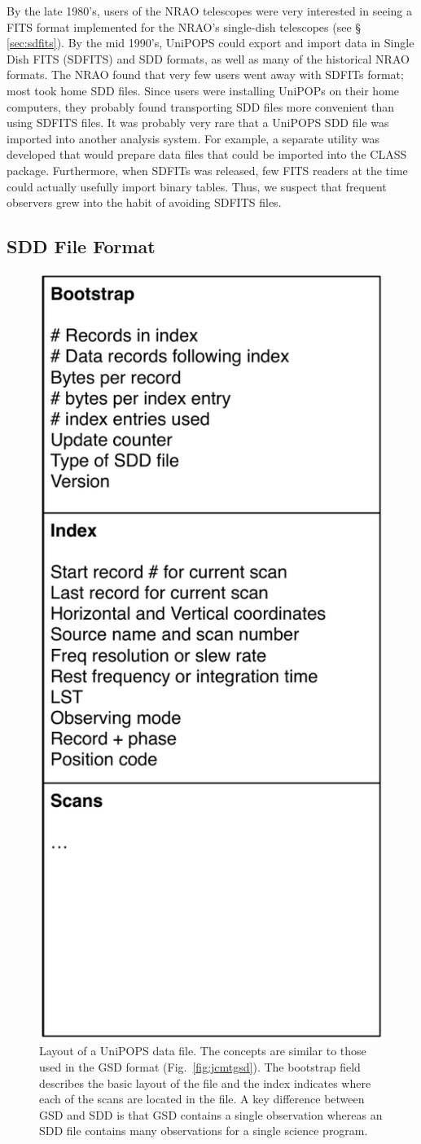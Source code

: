 \documentclass[final,authoryear,5p,times,twocolumn]{elsarticle}
\begin{document}
By the late 1980's, users of the NRAO telescopes were very interested
in seeing a FITS format implemented for the NRAO's single-dish
telescopes (see \S\,\ref{sec:sdfits}). By the mid 1990's,
UniPOPS could export and import data in Single Dish FITS (SDFITS) and
SDD formats, as well as many
of the historical NRAO formats.  The NRAO found that very few users
went away with SDFITs format; most took home SDD files.  Since
users were installing UniPOPs on their home computers, they probably
found transporting SDD files more convenient than using
SDFITS files.  It was probably very rare that a UniPOPS SDD file was
imported into another analysis system.  For example, a separate
utility was developed that would prepare data files that could be
imported into the {\textsc CLASS} package.
Furthermore, when SDFITs was released, few FITS readers at the
time could actually usefully import binary tables.  Thus, we suspect
that frequent observers grew into the habit of avoiding SDFITS files.

\subsection{SDD File Format}

\begin{figure}[t]
\begin{center}
\includegraphics[width=0.5\columnwidth]{sdd-file-layout}
\end{center}
\caption{Layout of a UniPOPS data file. The concepts are similar to
  those used in the GSD format (Fig.~\ref{fig:jcmtgsd}). The bootstrap
  field describes the basic layout of the file and the index indicates
  where each of the scans are located in the file. A key difference
  between GSD and SDD is that GSD contains a single observation
  whereas an SDD file contains many observations for a single science
  program.}
\label{fig:nraosdd}
\end{figure}
\end{document}
